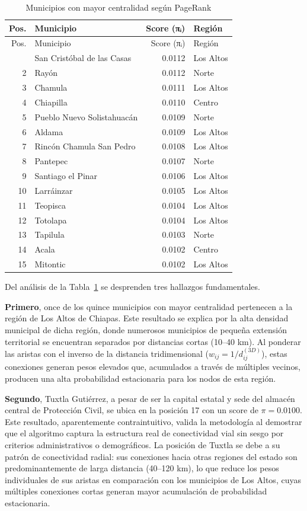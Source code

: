 \documentclass[
  spanish,
  us-letterpaper,
]{scrreprt}
\numberwithin{equation}{section}
\begin{document}
\begin{longtable}[]{@{}rlrl@{}}
\caption{Municipios con mayor centralidad según
PageRank}\label{tbl-pagerank}\tabularnewline
\toprule\noalign{}
Pos. & Municipio & Score (πᵢ) & Región \\
\midrule\noalign{}
\endfirsthead
\toprule\noalign{}
Pos. & Municipio & Score (πᵢ) & Región \\
\midrule\noalign{}
\endhead
\bottomrule\noalign{}
\endlastfoot
1 & San Cristóbal de las Casas & 0.0112 & Los Altos \\
2 & Rayón & 0.0112 & Norte \\
3 & Chamula & 0.0111 & Los Altos \\
4 & Chiapilla & 0.0110 & Centro \\
5 & Pueblo Nuevo Solistahuacán & 0.0109 & Norte \\
6 & Aldama & 0.0109 & Los Altos \\
7 & Rincón Chamula San Pedro & 0.0108 & Los Altos \\
8 & Pantepec & 0.0107 & Norte \\
9 & Santiago el Pinar & 0.0106 & Los Altos \\
10 & Larráinzar & 0.0105 & Los Altos \\
11 & Teopisca & 0.0104 & Los Altos \\
12 & Totolapa & 0.0104 & Los Altos \\
13 & Tapilula & 0.0103 & Norte \\
14 & Acala & 0.0102 & Centro \\
15 & Mitontic & 0.0102 & Los Altos \\
\end{longtable}

Del análisis de la Tabla~\ref{tbl-pagerank} se desprenden tres hallazgos
fundamentales.

\textbf{Primero}, once de los quince municipios con mayor centralidad
pertenecen a la región de Los Altos de Chiapas. Este resultado se
explica por la alta densidad municipal de dicha región, donde numerosos
municipios de pequeña extensión territorial se encuentran separados por
distancias cortas (10--40 km). Al ponderar las aristas con el inverso de
la distancia tridimensional (\(w_{ij} = 1/d_{ij}^{(3D)}\)), estas
conexiones generan pesos elevados que, acumulados a través de múltiples
vecinos, producen una alta probabilidad estacionaria para los nodos de
esta región.

\textbf{Segundo}, Tuxtla Gutiérrez, a pesar de ser la capital estatal y
sede del almacén central de Protección Civil, se ubica en la posición 17
con un score de \(\pi = 0.0100\). Este resultado, aparentemente
contraintuitivo, valida la metodología al demostrar que el algoritmo
captura la estructura real de conectividad vial sin sesgo por criterios
administrativos o demográficos. La posición de Tuxtla se debe a su
patrón de conectividad radial: sus conexiones hacia otras regiones del
estado son predominantemente de larga distancia (40--120 km), lo que
reduce los pesos individuales de sus aristas en comparación con los
municipios de Los Altos, cuyas múltiples conexiones cortas generan mayor
acumulación de probabilidad estacionaria.
\end{document}
